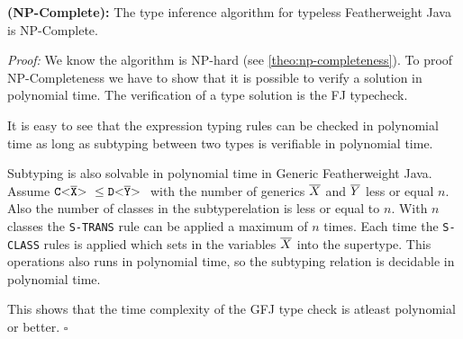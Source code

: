 \begin{theoremAndi}
  \label{theo:np-completeness}
  \textbf{(NP-Complete):}
  The type inference algorithm for typeless Featherweight Java is NP-Complete.
\end{theoremAndi}

\textit{Proof:} We know the algorithm is NP-hard (see \ref{theo:np-completeness}).
To proof NP-Completeness we have to show that it is possible to verify a solution in polynomial time.
The verification of a type solution is the FJ typecheck.

It is easy to see that the expression typing rules can be checked in polynomial time as long as subtyping between two types is verifiable in polynomial time.

Subtyping is also solvable in polynomial time in Generic Featherweight Java.
Assume $\mathtt{C {\tt <} \overline{X} {\tt >} \ } \leq \mathtt{D {\tt <} \overline{Y} {\tt >} \ }$ with the number of generics $\overline{X}$ and $\overline{Y}$ less or equal $n$.
Also the number of classes in the subtyperelation is less or equal to $n$.
With $n$ classes the \texttt{S-TRANS} rule can be applied a maximum of $n$ times.
Each time the \texttt{S-CLASS} rules is applied which sets in the variables $\overline{X}$ into the supertype.
This operations also runs in polynomial time, so the subtyping relation is decidable in polynomial time.

This shows that the time complexity of the GFJ type check is atleast polynomial or better.
\hfill $\square$